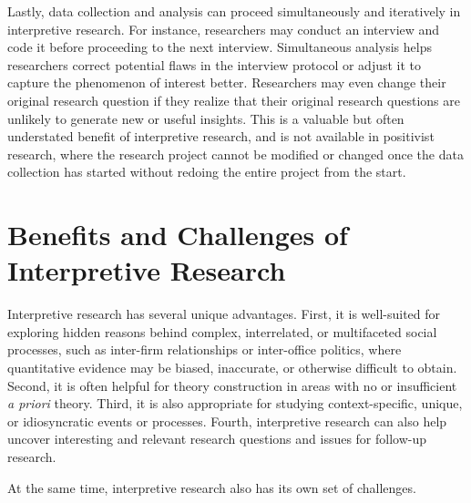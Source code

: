 Lastly, data collection and analysis can proceed simultaneously and iteratively in interpretive research. For instance, researchers may conduct an interview and code it before proceeding to the next interview. Simultaneous analysis helps researchers correct potential flaws in the interview protocol or adjust it to capture the phenomenon of interest better. Researchers may even change their original research question if they realize that their original research questions are unlikely to generate new or useful insights. This is a valuable but often understated benefit of interpretive research, and is not available in positivist research, where the research project cannot be modified or changed once the data collection has started without redoing the entire project from the start.

\section{Benefits and Challenges of Interpretive Research}

Interpretive research has several unique advantages. First, it is well-suited for exploring hidden reasons behind complex, interrelated, or multifaceted social processes, such as inter-firm relationships or inter-office politics, where quantitative evidence may be biased, inaccurate, or otherwise difficult to obtain. Second, it is often helpful for theory construction in areas with no or insufficient \textit{a priori} theory. Third, it is also appropriate for studying context-specific, unique, or idiosyncratic events or processes. Fourth, interpretive research can also help uncover interesting and relevant research questions and issues for follow-up research.

At the same time, interpretive research also has its own set of challenges.

